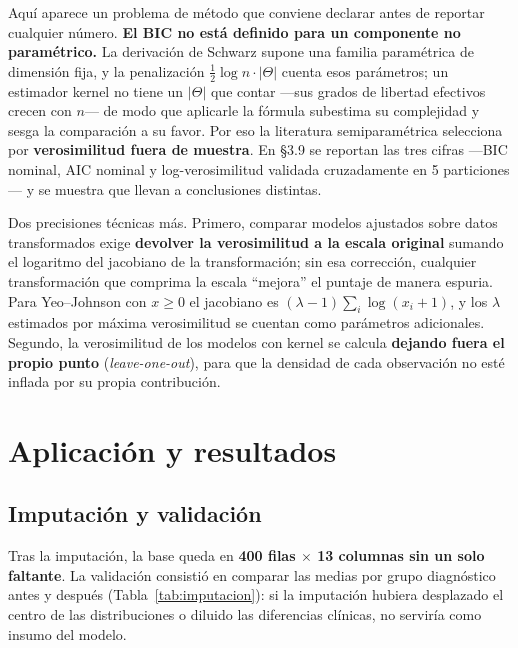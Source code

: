 \documentclass[11pt, a4paper]{article}
\begin{document}
Aquí aparece un problema de método que conviene declarar antes de reportar cualquier número.
\textbf{El BIC no está definido para un componente no paramétrico.} La derivación de Schwarz
\cite{schwarz1978} supone una familia paramétrica de dimensión fija, y la penalización
$\tfrac{1}{2}\log n \cdot |\Theta|$ cuenta esos parámetros; un estimador kernel no tiene un
$|\Theta|$ que contar —sus grados de libertad efectivos crecen con $n$— de modo que aplicarle la
fórmula subestima su complejidad y sesga la comparación a su favor. Por eso la literatura
semiparamétrica \cite{atienza2022,hastie2009} selecciona por \textbf{verosimilitud fuera de
muestra}. En \S3.9 se reportan las tres cifras —BIC nominal, AIC nominal y log-verosimilitud
validada cruzadamente en 5 particiones— y se muestra que llevan a conclusiones distintas.

Dos precisiones técnicas más. Primero, comparar modelos ajustados sobre datos transformados exige
\textbf{devolver la verosimilitud a la escala original} sumando el logaritmo del jacobiano de la
transformación; sin esa corrección, cualquier transformación que comprima la escala ``mejora'' el
puntaje de manera espuria. Para Yeo--Johnson con $x \geq 0$ el jacobiano es
$(\lambda-1)\sum_i \log(x_i+1)$, y los $\lambda$ estimados por máxima verosimilitud se cuentan como
parámetros adicionales. Segundo, la verosimilitud de los modelos con kernel se calcula
\textbf{dejando fuera el propio punto} (\textit{leave-one-out}), para que la densidad de cada
observación no esté inflada por su propia contribución.

\section{Aplicación y resultados}

\subsection{Imputación y validación}

Tras la imputación, la base queda en \textbf{400 filas $\times$ 13 columnas sin un solo faltante}.
La validación consistió en comparar las medias por grupo diagnóstico antes y después
(Tabla~\ref{tab:imputacion}): si la imputación hubiera desplazado el centro de las distribuciones o
diluido las diferencias clínicas, no serviría como insumo del modelo.
\end{document}
